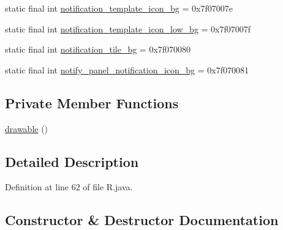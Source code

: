 \begin{DoxyCompactItemize}
\item 
static final int \mbox{\hyperlink{classandroid_1_1support_1_1graphics_1_1drawable_1_1_r_1_1drawable_a3a1f9adebded4090513d2adfad776b00}{notification\+\_\+template\+\_\+icon\+\_\+bg}} = 0x7f07007e
\item 
static final int \mbox{\hyperlink{classandroid_1_1support_1_1graphics_1_1drawable_1_1_r_1_1drawable_aa043c18192131873dfb9e8726226b99a}{notification\+\_\+template\+\_\+icon\+\_\+low\+\_\+bg}} = 0x7f07007f
\item 
static final int \mbox{\hyperlink{classandroid_1_1support_1_1graphics_1_1drawable_1_1_r_1_1drawable_ad7bb393526fbabc1f476d1ba3e4c8e32}{notification\+\_\+tile\+\_\+bg}} = 0x7f070080
\item 
static final int \mbox{\hyperlink{classandroid_1_1support_1_1graphics_1_1drawable_1_1_r_1_1drawable_a68192417427687e55d351e38d84bb5d4}{notify\+\_\+panel\+\_\+notification\+\_\+icon\+\_\+bg}} = 0x7f070081
\end{DoxyCompactItemize}
\subsection*{Private Member Functions}
\begin{DoxyCompactItemize}
\item 
\mbox{\hyperlink{classandroid_1_1support_1_1graphics_1_1drawable_1_1_r_1_1drawable_a54402ab6fc9a530f19c65c3da43997b0}{drawable}} ()
\end{DoxyCompactItemize}


\subsection{Detailed Description}


Definition at line 62 of file R.\+java.



\subsection{Constructor \& Destructor Documentation}
\mbox{\label{classandroid_1_1support_1_1graphics_1_1drawable_1_1_r_1_1drawable_a54402ab6fc9a530f19c65c3da43997b0}} 
